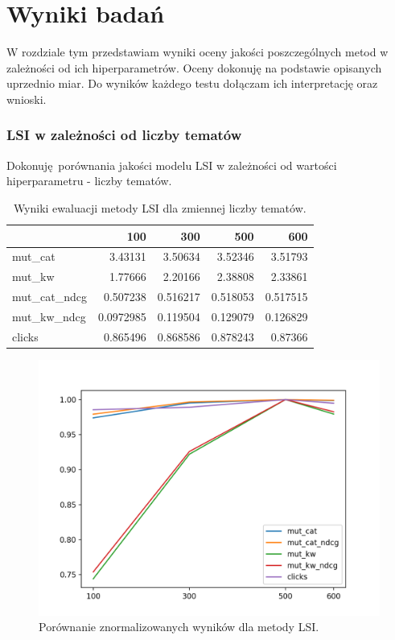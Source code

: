 \documentclass[pl]{minipw} %
\begin{document}
\chapter{Wyniki badań}
W rozdziale tym przedstawiam wyniki oceny jakości poszczególnych metod w zależności od ich hiperparametrów. Oceny dokonuję na podstawie opisanych uprzednio miar. Do wyników każdego testu dołączam ich interpretację oraz wnioski.

\subsection{LSI w zależności od liczby tematów}

Dokonuję porównania jakości modelu LSI w zależności od wartości hiperparametru - liczby tematów.

\begin{table}
	\centering
	\begin{tabular}{lrrrr}
		\hline
		&       100 &      300 &      500 &      600 \\
		\hline
		mut\_cat      & 3.43131   & 3.50634  & 3.52346  & 3.51793  \\
		mut\_kw       & 1.77666   & 2.20166  & 2.38808  & 2.33861  \\
		mut\_cat\_ndcg & 0.507238  & 0.516217 & 0.518053 & 0.517515 \\
		mut\_kw\_ndcg  & 0.0972985 & 0.119504 & 0.129079 & 0.126829 \\
		clicks       & 0.865496  & 0.868586 & 0.878243 & 0.87366  \\
		\hline
	\end{tabular}
	\caption{Wyniki ewaluacji metody LSI dla zmiennej liczby tematów.}
\end{table}

\begin{figure}[H]
	\centering
	\includegraphics[width=1\textwidth]{img/results/lsi.png}
	\caption{Porównanie znormalizowanych wyników dla metody LSI.}
\end{figure}
\end{document}
